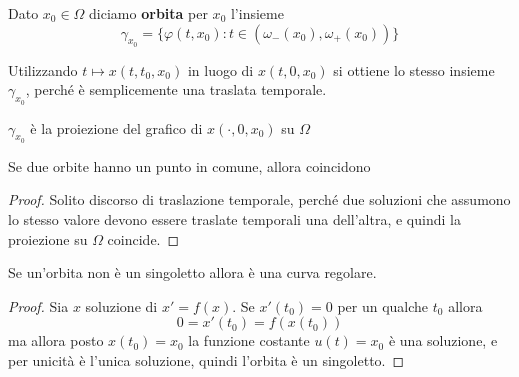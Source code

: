 \begin{definition}

Dato \(x_{0} \in \Omega\) diciamo \textbf{orbita} per \(x_{0}\) l'insieme 
\[
    \gamma_{x_{0}} = \{\varphi {(t, x_{0})} : t \in {(\omega_-{(x_{0})},
    \omega_+{(x_{0})})}\}
\]
\end{definition}
\begin{remark}
    Utilizzando \(t \mapsto x{(t, t_{0},x_{0})}\) in luogo di \(x{(t, 0,
    x_{0})}\) si ottiene lo stesso insieme \(\gamma_{x_{0}}\), perché è
    semplicemente una traslata temporale.
\end{remark}
\begin{note}
    \(\gamma_{x_{0}} \) è la proiezione del grafico di \(x{(\cdot ,0, x_{0})}\)
    su \(\Omega\) 
\end{note}
\begin{proposition}
    Se due orbite hanno un punto in comune, allora coincidono
\end{proposition}
\begin{proof}
    Solito discorso di traslazione temporale, perché due soluzioni che assumono
    lo stesso valore devono essere traslate temporali una dell'altra, e quindi
    la proiezione su \(\Omega\) coincide.
\end{proof}
\begin{proposition}
    Se un'orbita non è un singoletto allora è una curva regolare.
\end{proposition}
\begin{proof}
    Sia \(x\) soluzione di \(x' = f{(x)}\). Se \(x'{(t_{0})} = 0\) per un
    qualche \(t_{0}\) allora
    \[
        0 = x'{(t_{0})} = f{(x{(t_{0})})}
    \]
    ma allora posto \(x{(t_{0})} = x_{0}\) la funzione costante \(u{(t)} =
    x_{0}\) è una soluzione, e per unicità è l'unica soluzione, quindi l'orbita
    è un singoletto.
\end{proof}
